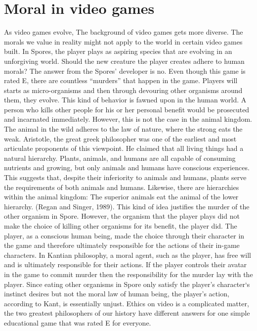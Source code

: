 \documentclass[10pt,twocolumn]{article}
\begin{document}
\section{Moral in video games}

 As video games evolve, The background of video games gets more diverse. The morals we value in reality might not apply to the world in certain video games built. In Spores, the player plays as aspiring species that are evolving in an unforgiving world. Should the new creature the player creates adhere to human morals? The answer from the Spores’ developer is no. Even though this game is rated E, there are countless “murders” that happen in the game. Players will starts as micro-organisms and then through devouring other organisms around them, they evolve. This kind of behavior is fawned upon in the human world. A person who kills other people for his or her personal benefit would be prosecuted and incarnated immediately. However, this is not the case in the animal kingdom. The animal in the wild adheres to the law of nature, where the strong eats the weak. Aristotle, the great greek philosopher was one of the earliest and most articulate proponents of this viewpoint. He claimed that all living things had a natural hierarchy. Plants, animals, and humans are all capable of consuming nutrients and growing, but only animals and humans have conscious experiences. This suggests that, despite their inferiority to animals and humans, plants serve the requirements of both animals and humans. Likewise, there are hierarchies within the animal kingdom: The superior animals eat the animal of the lower hierarchy. (Regan and Singer, 1989). This kind of idea justifies the murder of the other organism in Spore. However, the organism that the player plays did not make the choice of killing other organisms for its benefit, the player did.
The player, as a conscious human being, made the choice through their character in the game and therefore ultimately responsible for the actions of their in-game characters.  In Kantian philosophy, a moral agent, such as the player, has free will and is ultimately responsible for their actions. If the player controls their avatar in the game to commit murder then the responsibility for the murder lay with the player. Since eating other organisms in Spore only satisfy the player’s character‘s instinct desires but not the moral law of human being, the player’s action, according to Kant, is essentially unjust.
Ethics on video is a complicated matter, the two greatest philosophers of our history have different answers for one simple educational game that was rated E for everyone. 
\end{document}
